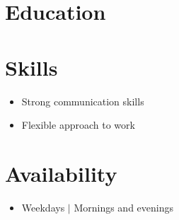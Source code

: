 \documentclass{resume_class}
\begin{document}
\section{Education}
\section{Skills}
\begin{itemize}[leftmargin = 10pt , labelsep = 3pt , parsep = 0pt , itemsep = 2pt , label =  {\small $\bullet$} ] 
	\item \mdseries \Large {Strong communication skills }
	\item \mdseries \Large  {Flexible approach to work }
\end{itemize}

\section{Availability }
\begin{itemize}[leftmargin = 10pt , labelsep = 3pt , parsep = 0pt , itemsep = 2pt , label =  {\small $\bullet$} ] 
	\item \mdseries \Large Weekdays $|$ Mornings and evenings
\end{itemize}
	
\end{document}
